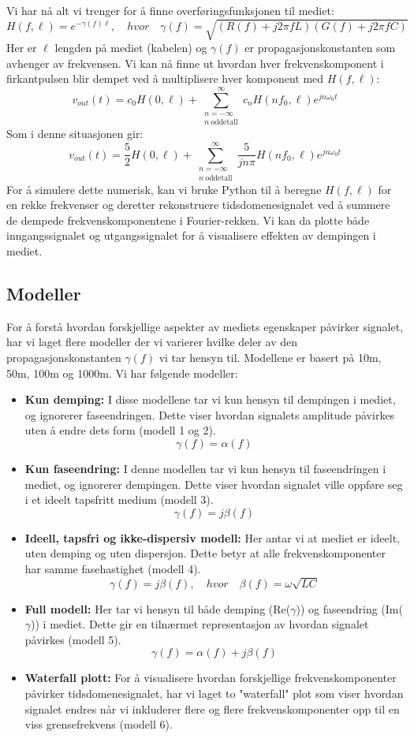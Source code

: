 \noindent Vi har nå alt vi trenger for å finne overføringsfunksjonen til mediet:
\[
    H(f, \ell) = e^{-\gamma(f) \ell}, \quad hvor \quad \gamma(f) = \sqrt{(R(f) + j 2\pi f L)(G(f) + j 2\pi f C)}
\]
Her er $\ell$ lengden på mediet (kabelen) og $\gamma(f)$ er propagasjonskonstanten som avhenger av frekvensen.
Vi kan nå finne ut hvordan hver frekvenskomponent i firkantpulsen blir dempet ved å multiplisere hver komponent med $H(f, \ell)$:
\[
    v_{out}(t) = c_0H(0, \ell) + \sum_{\substack{n=-\infty\\ n\ \text{oddetall}}}^{\infty} c_n H(n f_0, \ell) e^{j n \omega_0 t}
\]
Som i denne situasjonen gir:
\[
    v_{out}(t) = \frac{5}{2}H(0, \ell) + \sum_{\substack{n=-\infty\\ n\ \text{oddetall}}}^{\infty} \frac{5}{j n \pi} H(n f_0, \ell) e^{j n \omega_0 t}
\]
For å simulere dette numerisk, kan vi bruke Python til å beregne $H(f, \ell)$ for en rekke frekvenser og deretter rekonstruere tidsdomenesignalet ved å summere de dempede frekvenskomponentene i Fourier-rekken.
Vi kan da plotte både inngangssignalet og utgangssignalet for å visualisere effekten av dempingen i mediet.
\clearpage
\subsection{Modeller}
For å forstå hvordan forskjellige aspekter av mediets egenskaper påvirker signalet, har vi laget flere modeller der vi varierer hvilke deler av den propagasjonskonstanten $\gamma(f)$ vi tar hensyn til. Modellene er basert på 10m, 50m, 100m og 1000m. Vi har følgende modeller:\\
\begin{itemize}
    \item \textbf{Kun demping:} I disse modellene tar vi kun hensyn til dempingen i mediet, og ignorerer faseendringen. Dette viser hvordan signalets amplitude påvirkes uten å endre dets form (modell 1 og 2).
    \[
        \gamma(f) = \alpha(f)
    \]
    \item \textbf{Kun faseendring:} I denne modellen tar vi kun hensyn til faseendringen i mediet, og ignorerer dempingen. Dette viser hvordan signalet ville oppføre seg i et ideelt tapsfritt medium (modell 3).
    \[
        \gamma(f) = j\beta(f)
    \]
    \item \textbf{Ideell, tapsfri og ikke-dispersiv modell:} Her antar vi at mediet er ideelt, uten demping og uten dispersjon. Dette betyr at alle frekvenskomponenter har samme fasehastighet (modell 4).
    \[
        \gamma(f) = j\beta(f), \quad hvor \quad \beta(f) = \omega\sqrt{LC}
    \]
    \item \textbf{Full modell:} Her tar vi hensyn til både demping (Re($\gamma$)) og faseendring (Im($\gamma$)) i mediet. Dette gir en tilnærmet representasjon av hvordan signalet påvirkes (modell 5).
    \[
        \gamma(f) = \alpha(f) + j\beta(f)
    \]
    \item \textbf{Waterfall plott:} For å visualisere hvordan forskjellige frekvenskomponenter påvirker tidsdomenesignalet, har vi laget to "waterfall" plot som viser hvordan signalet endres når vi inkluderer flere og flere frekvenskomponenter opp til en viss grensefrekvens (modell 6).
\end{itemize}
\clearpage
